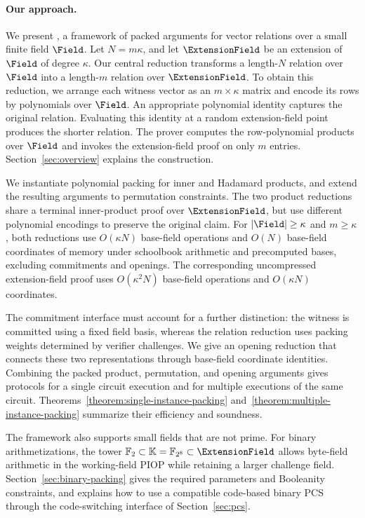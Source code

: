 \paragraph{Our approach.}
We present \methodname, a framework of packed arguments for vector
relations over a small finite field \(\Field\).
Let \(N=m\kappa\), and let \(\ExtensionField\) be an extension of
\(\Field\) of degree \(\kappa\).
Our central reduction transforms a length-\(N\) relation over
\(\Field\) into a length-\(m\) relation over \(\ExtensionField\).
To obtain this reduction, we arrange each witness vector as an
\(m\times\kappa\) matrix and encode its rows by polynomials over
\(\Field\). An appropriate polynomial identity captures the
original relation. Evaluating this identity at a random
extension-field point produces the shorter relation.
The prover computes the row-polynomial products over \(\Field\)
and invokes the extension-field proof on only \(m\) entries.
Section~\ref{sec:overview} explains the construction.

We instantiate polynomial packing for inner and Hadamard products,
and extend the resulting arguments to permutation constraints.
The two product reductions share a terminal inner-product proof
over \(\ExtensionField\), but use different polynomial encodings
to preserve the original claim.
For \(|\Field|\geq\kappa\) and \(m\geq\kappa\), both reductions
use \(O(\kappa N)\) base-field operations and \(O(N)\) base-field
coordinates of memory under schoolbook arithmetic and precomputed
bases, excluding commitments and openings.
The corresponding uncompressed extension-field proof uses
\(O(\kappa^2N)\) base-field operations and \(O(\kappa N)\)
coordinates.

The commitment interface must account for a further distinction:
the witness is committed using a fixed field basis, whereas the
relation reduction uses packing weights determined by verifier
challenges. We give an opening reduction that connects these two
representations through base-field coordinate identities.
Combining the packed product, permutation, and opening arguments
gives protocols for a single circuit execution and for multiple
executions of the same circuit.
Theorems~\ref{theorem:single-instance-packing}
and~\ref{theorem:multiple-instance-packing} summarize their
efficiency and soundness.

The framework also supports small fields that are not prime.
For binary arithmetizations, the tower
\(\mathbb F_2\subset\mathbb K=\mathbb F_{2^8}\subset\ExtensionField\)
allows byte-field arithmetic in the working-field PIOP while
retaining a larger challenge field.
Section~\ref{sec:binary-packing} gives the required parameters and
Booleanity constraints, and explains how to use a compatible
code-based binary PCS through the code-switching interface of
Section~\ref{sec:pcs}.

